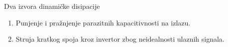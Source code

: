 \begin{frame}[label=09_2-s054]{Dva izvora dinamičke disipacije}
\begin{enumerate}
\item Punjenje i pražnjenje parazitnih kapacitivnosti na izlazu.
\vspace{5mm}
\item Struja kratkog spoja kroz invertor zbog neidealnosti ulaznih signala.
\end{enumerate}
\end{frame}

